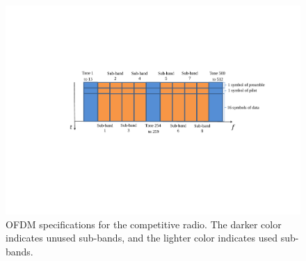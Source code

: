 \begin{figure}[tpb]
  \begin{center}
    \centerline{\includegraphics[width=160mm]{CompPhysicalLayer.pdf}}
    \caption{OFDM specifications for the competitive radio. The darker color indicates unused sub-bands, and the lighter color indicates used sub-bands.}
    \label{fig:CompPhysicalLayer}
  \end{center}
\end{figure}
